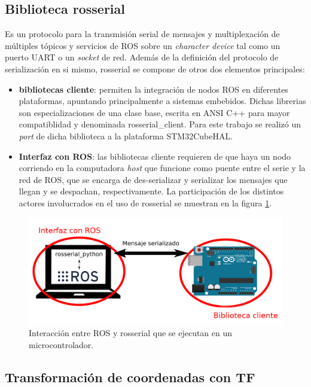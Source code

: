 \subsection{Biblioteca rosserial}\label{sec:rosserial}

Es un protocolo para la transmisión serial de mensajes y multiplexación de múltiples tópicos y servicios de ROS sobre un \textit{character device} tal como un puerto UART o un \textit{socket} de red.
Además de la definición del protocolo de serialización en si mismo, rosserial se compone de otros dos elementos principales:
\begin{itemize}
    \item \textbf{bibliotecas cliente}: permiten la integración de nodos ROS en diferentes plataformas, apuntando principalmente a sistemas embebidos. Dichas librerias son especializaciones de una clase base, escrita en ANSI C++ para mayor compatiblidad y denominada rosserial\_client. Para este trabajo se realizó un \textit{port} de dicha biblioteca a la plataforma STM32CubeHAL.
    \item \textbf{Interfaz con ROS}: las bibliotecas cliente requieren de que haya un nodo corriendo en la computadora \textit{host} que funcione como puente entre el serie y la red de ROS, que se encarga de des-serializar y serializar los mensajes que llegan y se despachan, respectivamente. La participación de los distintos actores involucrados en el uso de rosserial se muestran en la figura \ref{fig:rosserial}.
\end{itemize}

\begin{figure}[ht]
    \centering
    \includegraphics[scale=0.6]{./Figures/rosserial.png}
    \caption{Interacción entre ROS y rosserial que se ejecutan en un microcontrolador.}
    \label{fig:rosserial}
\end{figure}

\subsection{Transformación de coordenadas con TF}

